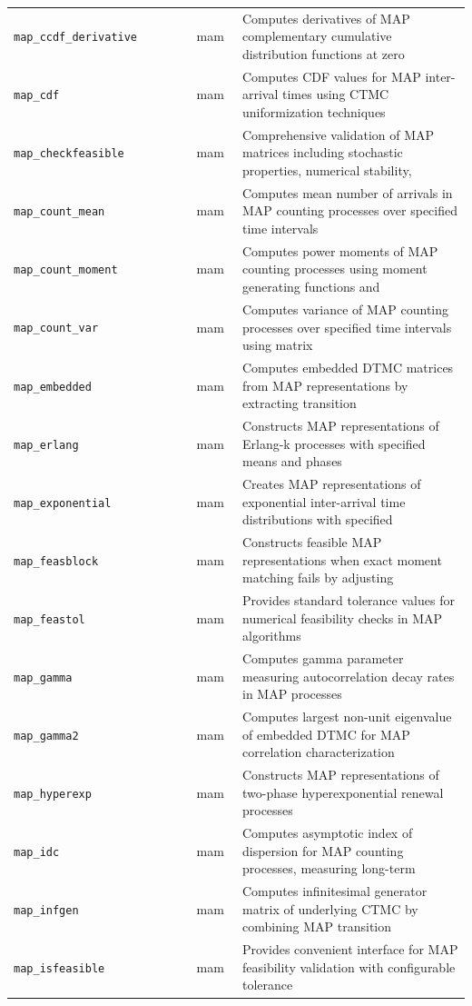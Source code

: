 \begin{footnotesize}
\begin{longtable}{|p{0.4\linewidth}|p{0.1\linewidth}|p{0.5\linewidth}|}
\texttt{map\_ccdf\_derivative} & mam & Computes derivatives of MAP complementary cumulative distribution functions at zero\\
\texttt{map\_cdf} & mam & Computes CDF values for MAP inter-arrival times using CTMC uniformization techniques\\
\texttt{map\_checkfeasible} & mam & Comprehensive validation of MAP matrices including stochastic properties, numerical stability,\\
\texttt{map\_count\_mean} & mam & Computes mean number of arrivals in MAP counting processes over specified time intervals\\
\texttt{map\_count\_moment} & mam & Computes power moments of MAP counting processes using moment generating functions and\\
\texttt{map\_count\_var} & mam & Computes variance of MAP counting processes over specified time intervals using matrix\\
\texttt{map\_embedded} & mam & Computes embedded DTMC matrices from MAP representations by extracting transition\\
\texttt{map\_erlang} & mam & Constructs MAP representations of Erlang-k processes with specified means and phases\\
\texttt{map\_exponential} & mam & Creates MAP representations of exponential inter-arrival time distributions with specified\\
\texttt{map\_feasblock} & mam & Constructs feasible MAP representations when exact moment matching fails by adjusting\\
\texttt{map\_feastol} & mam & Provides standard tolerance values for numerical feasibility checks in MAP algorithms\\
\texttt{map\_gamma} & mam & Computes gamma parameter measuring autocorrelation decay rates in MAP processes\\
\texttt{map\_gamma2} & mam & Computes largest non-unit eigenvalue of embedded DTMC for MAP correlation characterization\\
\texttt{map\_hyperexp} & mam & Constructs MAP representations of two-phase hyperexponential renewal processes\\
\texttt{map\_idc} & mam & Computes asymptotic index of dispersion for MAP counting processes, measuring long-term\\
\texttt{map\_infgen} & mam & Computes infinitesimal generator matrix of underlying CTMC by combining MAP transition\\
\texttt{map\_isfeasible} & mam & Provides convenient interface for MAP feasibility validation with configurable tolerance\\

\end{longtable}
\end{footnotesize}
